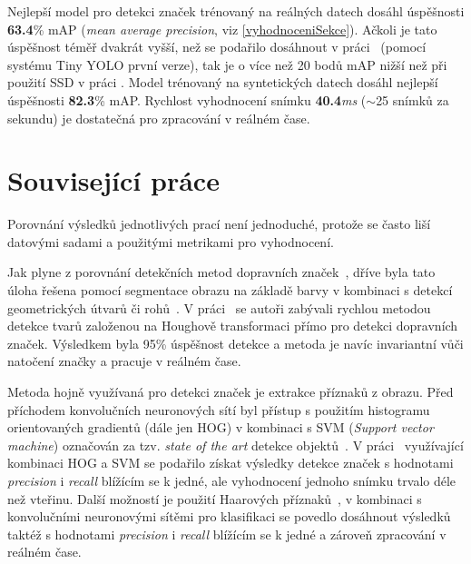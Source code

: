 \documentclass[czech]{ExcelAtFIT} %
\begin{document}


Nejlepší model pro detekci značek trénovaný na reálných datech dosáhl úspěšnosti \textbf{63.4}\% mAP (\emph{mean average precision}, viz \ref{vyhodnoceniSekce}). Ačkoli je tato úspěšnost téměř dvakrát vyšší, než se podařilo dosáhnout v práci~\cite{tsdYolo} (pomocí systému Tiny YOLO první verze), tak je o více než 20 bodů mAP nižší než při použití SSD v práci \cite{tsdSsd}.
Model trénovaný na syntetických datech dosáhl nejlepší úspěšnosti \textbf{82.3}\% mAP.
Rychlost vyhodnocení snímku \textbf{40.4}\emph{ms} ($\sim$25 snímků za sekundu) je dostatečná pro zpracování v reálném čase.

\section{Související práce}
Porovnání výsledků jednotlivých prací není jednoduché, protože se často liší datovými sadami a použitými metrikami pro vyhodnocení.

Jak plyne z porovnání detekčních metod dopravních značek~\cite{tsDetectOverview}, dříve byla tato úloha řešena pomocí segmentace obrazu na základě barvy v kombinaci s detekcí geometrických útvarů či rohů~\cite{tsDetect}. V práci~\cite{fastShapeTSD} se autoři zabývali rychlou metodou detekce tvarů založenou na Houghově transformaci přímo pro detekci dopravních značek. Výsledkem byla 95\% úspěšnost detekce a metoda je navíc invariantní vůči natočení značky a pracuje v reálném čase.

Metoda hojně využívaná pro detekci značek je extrakce příznaků z obrazu. Před příchodem konvolučních neuronových sítí byl přístup s použitím histogramu orientovaných gradientů (dále jen HOG) v kombinaci s SVM (\emph{Support vector machine}) označován za tzv. \emph{state of the art} detekce objektů~\cite{tsdYolo}. V práci~\cite{tsdHog} využívající kombinaci HOG a SVM se podařilo získat výsledky detekce značek s hodnotami \emph{precision} i \emph{recall} blížícím se k jedné, ale vyhodnocení jednoho snímku trvalo déle než vteřinu. Další možností je použití Haarových příznaků~\cite{tsdHaar}, v kombinaci s konvolučními neuronovými sítěmi pro klasifikaci se povedlo dosáhnout výsledků taktéž s hodnotami \emph{precision} i \emph{recall} blížícím se k jedné a zároveň zpracování v reálném čase.
\end{document}
